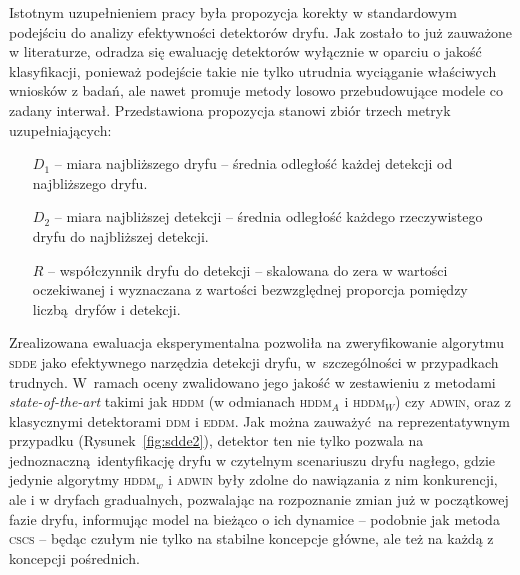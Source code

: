 Istotnym uzupełnieniem pracy była propozycja korekty w standardowym podejściu do analizy efektywności detektorów dryfu. Jak zostało to już zauważone w literaturze, odradza się ewaluację detektorów wyłącznie w oparciu o jakość klasyfikacji, ponieważ podejście takie nie tylko utrudnia wyciąganie właściwych wniosków z badań, ale nawet promuje metody losowo przebudowujące modele co zadany interwał. Przedstawiona propozycja stanowi zbiór trzech metryk uzupełniających:

\begin{itemize}
	\item[$D_1$] -- miara najbliższego dryfu -- średnia odległość każdej detekcji od najbliższego dryfu.
	\item[$D_2$] -- miara najbliższej detekcji -- średnia odległość każdego rzeczywistego dryfu do najbliższej detekcji.
	\item[$R$] -- współczynnik dryfu do detekcji -- skalowana do zera w wartości oczekiwanej i wyznaczana z wartości bezwzględnej proporcja pomiędzy liczbą dryfów i detekcji.
\end{itemize}

Zrealizowana ewaluacja eksperymentalna pozwoliła na zweryfikowanie algorytmu \textsc{sdde} jako efektywnego narzędzia detekcji dryfu, w~szczególności w przypadkach trudnych. W~ramach oceny zwalidowano jego jakość w zestawieniu z metodami \emph{state-of-the-art} takimi jak \textsc{hddm} (w odmianach \textsc{hddm}$_A$ i \textsc{hddm}$_W$) czy \textsc{adwin}, oraz z klasycznymi detektorami \textsc{ddm} i \textsc{eddm}. Jak można zauważyć na reprezentatywnym przypadku (Rysunek~\ref{fig:sdde2}), detektor ten nie tylko pozwala na jednoznaczną identyfikację dryfu w czytelnym scenariuszu dryfu nagłego, gdzie jedynie algorytmy \textsc{hddm}$_w$ i \textsc{adwin} były zdolne do nawiązania z nim konkurencji, ale i w dryfach gradualnych, pozwalając na rozpoznanie zmian już w początkowej fazie dryfu, informując model na bieżąco o ich dynamice -- podobnie jak metoda \textsc{cscs} -- będąc czułym nie tylko na stabilne koncepcje główne, ale też na każdą z koncepcji pośrednich.

